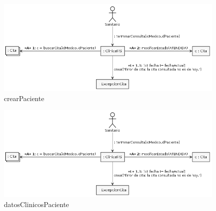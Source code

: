 \documentclass[11pt,a4paper]{article}
\begin{document}
\begin{figure}[H]
	\caption{crearPaciente}
	\centering
	\includegraphics[width=\textwidth,height=\textheight,keepaspectratio]{Diagramas/terminarconsulta}
\end{figure}

\begin{figure}[H]
	\caption{datosClinicosPaciente}
	\centering
	\includegraphics[width=\textwidth,height=\textheight,keepaspectratio]{Diagramas/terminarconsulta}
\end{figure}
\end{document}
